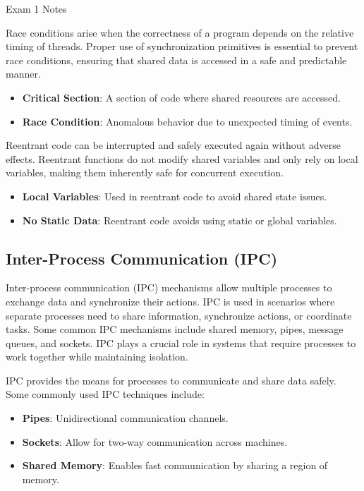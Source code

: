 \begin{examnotes}{Exam 1 Notes}
    \begin{highlight}
        Race conditions arise when the correctness of a program depends on the relative timing of threads. Proper use of synchronization primitives is essential to prevent race conditions, ensuring that 
        shared data is accessed in a safe and predictable manner.
        \begin{itemize}
            \item \textbf{Critical Section}: A section of code where shared resources are accessed.
            \item \textbf{Race Condition}: Anomalous behavior due to unexpected timing of events.
        \end{itemize}
    \end{highlight}
    
    \begin{highlight}
        Reentrant code can be interrupted and safely executed again without adverse effects. Reentrant functions do not modify shared variables and only rely on local variables, making them inherently 
        safe for concurrent execution.
        \begin{itemize}
            \item \textbf{Local Variables}: Used in reentrant code to avoid shared state issues.
            \item \textbf{No Static Data}: Reentrant code avoids using static or global variables.
        \end{itemize}
    \end{highlight}
    
    \subsection*{Inter-Process Communication (IPC)}
    
    Inter-process communication (IPC) mechanisms allow multiple processes to exchange data and synchronize their actions. IPC is used in scenarios where separate processes need to share information, 
    synchronize actions, or coordinate tasks. Some common IPC mechanisms include shared memory, pipes, message queues, and sockets. IPC plays a crucial role in systems that require processes to work 
    together while maintaining isolation.
    
    \begin{highlight}
        IPC provides the means for processes to communicate and share data safely. Some commonly used IPC techniques include:
        \begin{itemize}
            \item \textbf{Pipes}: Unidirectional communication channels.
            \item \textbf{Sockets}: Allow for two-way communication across machines.
            \item \textbf{Shared Memory}: Enables fast communication by sharing a region of memory.
        \end{itemize}
    \end{highlight}
    

\end{examnotes}

